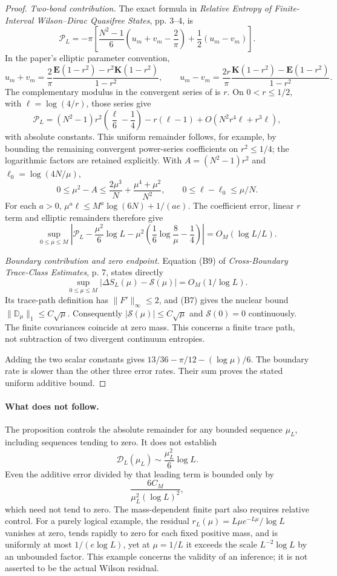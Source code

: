 \begin{proof}
\emph{Two-bond contribution.} The exact formula in \emph{Relative Entropy of Finite-Interval Wilson–Dirac Quasifree States}, pp. 3–4, is
\[
\mathcal P_L=-\pi\left[\frac{N^2-1}{6}\left(u_m+v_m-\frac2\pi\right)
+\frac12(u_m-v_m)\right].
\]
In the paper's elliptic parameter convention,
\[
u_m+v_m=\frac2\pi\frac{\mathbf E(1-r^2)-r^2\mathbf K(1-r^2)}{1-r^2},\qquad
u_m-v_m=\frac{2r}\pi\frac{\mathbf K(1-r^2)-\mathbf E(1-r^2)}{1-r^2}.
\]
The complementary modulus in the convergent series of \cite{dlmf} is $r$. On $0<r\le1/2$, with $\ell=\log(4/r)$, those series give
\[
\mathcal P_L=(N^2-1)r^2\left(\frac\ell6-\frac14\right)-r(\ell-1)
+O(N^2r^4\ell+r^3\ell),
\]
with absolute constants. This uniform remainder follows, for example, by bounding the remaining convergent power-series coefficients on $r^2\le1/4$; the logarithmic factors are retained explicitly. With $A=(N^2-1)r^2$ and $\ell_0=\log(4N/\mu)$,
\[
0\le\mu^2-A\le\frac{2\mu^3}{N}+\frac{\mu^4+\mu^2}{N^2},\qquad
0\le\ell-\ell_0\le\mu/N.
\]
For each $a>0$, $\mu^a\ell\le M^a\log(6N)+1/(ae)$. The coefficient error, linear $r$ term and elliptic remainders therefore give
\[
\sup_{0\le\mu\le M}\left|\mathcal P_L-\frac{\mu^2}{6}\log L
-\mu^2\left(\frac16\log\frac8\mu-\frac14\right)\right|
=O_M(\log L/L).
\]

\emph{Boundary contribution and zero endpoint.} Equation (B9) of \emph{Cross-Boundary Trace-Class Estimates}, p. 7, states directly
\[
\sup_{0\le\mu\le M}|\Delta S_L(\mu)-\mathcal S(\mu)|=O_M(1/\log L).
\]
Its trace-path definition has $\|F'\|_\infty\le2$, and (B7) gives the nuclear bound $\|\mathbb D_\mu\|_1\le C\sqrt\mu$. Consequently $|\mathcal S(\mu)|\le C\sqrt\mu$ and $\mathcal S(0)=0$ continuously. The finite covariances coincide at zero mass. This concerns a finite trace path, not subtraction of two divergent continuum entropies.

Adding the two scalar constants gives $13/36-\pi/12-(\log\mu)/6$. The boundary rate is slower than the other three error rates. Their sum proves the stated uniform additive bound.
\end{proof}

\paragraph{What does not follow.}
The proposition controls the absolute remainder for any bounded sequence $\mu_L$, including sequences tending to zero. It does not establish
\[
\mathcal D_L(\mu_L)\sim \frac{\mu_L^2}{6}\log L.
\]
Even the additive error divided by that leading term is bounded only by
\[\frac{6C_M}{\mu_L^2(\log L)^2},\]
which need not tend to zero. The mass-dependent finite part also requires relative control. For a purely logical example, the residual $r_L(\mu)=L\mu e^{-L\mu}/\log L$ vanishes at zero, tends rapidly to zero for each fixed positive mass, and is uniformly at most $1/(e\log L)$, yet at $\mu=1/L$ it exceeds the scale $L^{-2}\log L$ by an unbounded factor. This example concerns the validity of an inference; it is not asserted to be the actual Wilson residual.

